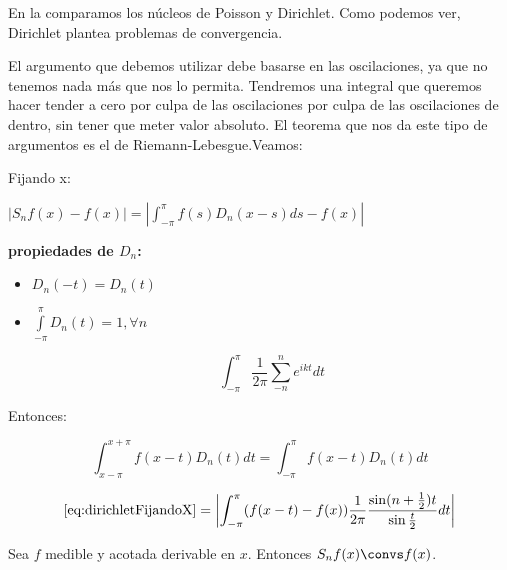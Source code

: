 	En la  comparamos los núcleos de Poisson y Dirichlet. Como podemos ver, Dirichlet plantea problemas de convergencia.

	El argumento que debemos utilizar debe basarse en las oscilaciones, ya que no tenemos nada más que nos lo permita. Tendremos una integral que queremos hacer tender a cero por culpa de las oscilaciones por culpa de las oscilaciones de dentro, sin tener que meter valor absoluto. El teorema que nos da este tipo de argumentos es el de Riemann-Lebesgue.Veamos:

	Fijando x:

	\( |S_n f(x) - f(x) | = \left| \int_{-\pi}^\pi f(s) D_n (x-s) ds - f(x) \right| \label{eq:dirichletFijandoX} \)

	\textbf{propiedades de $D_n$:}

	\begin{itemize}
		\item $D_n(-t) = D_n(t)$

		\item $\int\limits_{-\pi}^{\pi} D_n(t) = 1, \forall n $

		\[ \int_{-\pi}^\pi  \frac{1}{2\pi} \sum_{-n}^{n} e^{ikt} dt \]

	\end{itemize}


	Entonces:

	\[  \int_{x-\pi}^{x +\pi} f(x-t) D_n(t) dt = \int^{\pi}_{-\pi} f(x-t) D_n(t) dt \]

	\[ \eqref{eq:dirichletFijandoX} = \left| \int_{-\pi}^\pi (f(x-t)-f(x)) \frac{1}{2\pi} \frac{\sin(n+\frac{1}{2})t}{\sin{\frac{t}{2}}} dt \right| \]


	\begin{theorem} \label{thm:Dirichlet1}
		Sea $f$ medible y acotada derivable en $x$. Entonces $S_n f(x) \convs f(x)$.
	\end{theorem}

